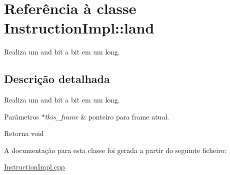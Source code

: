 \hypertarget{class_instruction_impl_1_1land}{}\section{Referência à classe Instruction\+Impl\+:\+:land}
\label{class_instruction_impl_1_1land}


Realiza um and bit a bit em um long.  




\subsection{Descrição detalhada}
Realiza um and bit a bit em um long. 


\begin{DoxyParams}{Parâmetros}
{\em $\ast$this\+\_\+frame} & ponteiro para frame atual. \\
\hline
\end{DoxyParams}
\begin{DoxyReturn}{Retorna}
void 
\end{DoxyReturn}


A documentação para esta classe foi gerada a partir do seguinte ficheiro\+:\begin{DoxyCompactItemize}
\item 
\hyperlink{_instruction_impl_8cpp}{Instruction\+Impl.\+cpp}\end{DoxyCompactItemize}
